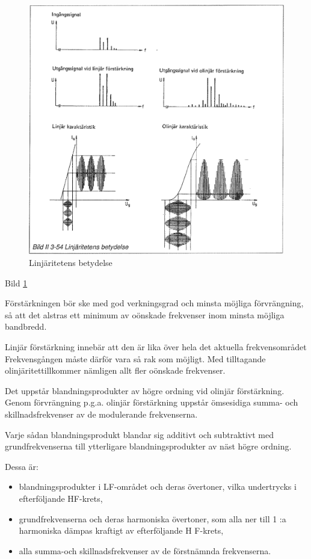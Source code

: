 \begin{figure}[h]
\begin{center}
\includegraphics[width=14cm]{images/bild_2_3-54}
\caption{Linjäritetens betydelse}
\label{fig:BildII3-54}
\end{center}
\end{figure}

Bild \ref{fig:BildII3-54}

Förstärkningen bör ske med god verkningsgrad och minsta möjliga
förvrängning, så att det alstras ett minimum av oönskade frekvenser
inom minsta möjliga bandbredd.

Linjär förstärkning innebär att den är lika över hela det aktuella
frekvensområdet Frekvensgången måste därför vara så rak som
möjligt. Med tilltagande olinjäritettillkommer nämligen allt fler
oönskade frekvenser.

Det uppstår blandningsprodukter av högre ordning vid olinjär
förstärkning. Genom förvrängning p.g.a. olinjär förstärkning uppstår
ömsesidiga summa- och skillnadsfrekvenser av de modulerande
frekvenserna.

Varje sådan blandningsprodukt blandar sig additivt och subtraktivt med
grundfrekvenserna till ytterligare blandningsprodukter av näst högre
ordning.

Dessa är:
\begin{itemize}
\item blandningsprodukter i LF-området och deras övertoner, vilka
  undertrycks i efterföljande HF-krets,

\item grundfrekvenserna och deras harmoniska övertoner, som alla ner
  till 1 :a harmoniska dämpas kraftigt av efterföljande H F-krets,

\item alla summa-och skillnadsfrekvenser av de förstnämnda frekvenserna.
\end{itemize}

